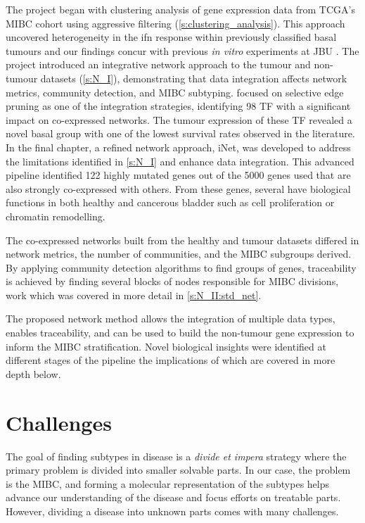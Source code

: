The project began with clustering analysis of gene expression data from TCGA's MIBC cohort using aggressive filtering (\cref{s:clustering_analysis}). This approach uncovered heterogeneity in the \acrlong{ifn} response within previously classified basal tumours \citep{Robertson2017-mg, Kamoun2020-tj} and our findings concur with previous \textit{in vitro} experiments at JBU \citep{Baker2022-bj}. The project introduced an integrative network approach to the tumour and non-tumour datasets (\cref{s:N_I}), demonstrating that data integration affects network metrics, community detection, and MIBC subtyping.  focused on selective edge pruning as one of the integration strategies, identifying 98 TF with a significant impact on co-expressed networks. The tumour expression of these TF revealed a novel basal group with one of the lowest survival rates observed in the literature. In the final chapter, a refined network approach, iNet, was developed to address the limitations identified in \cref{s:N_I} and enhance data integration. This advanced pipeline identified 122 highly mutated genes out of the 5000 genes used that are also strongly co-expressed with others. From these genes, several have biological functions in both healthy and cancerous bladder such as cell proliferation or chromatin remodelling. 

The co-expressed networks built from the healthy and tumour datasets differed in network metrics, the number of communities, and the MIBC subgroups derived. By applying community detection algorithms to find groups of genes, traceability is achieved by finding several blocks of nodes responsible for MIBC divisions, work which was covered in more detail in \cref{s:N_II:std_net}.

% 
The proposed network method allows the integration of multiple data types, enables traceability, and can be used to build the non-tumour gene expression to inform the MIBC stratification. Novel biological insights were identified at different stages of the pipeline the implications of which are covered in more depth below.

\section{Challenges}

The goal of finding subtypes in disease is a \textit{divide et impera} strategy where the primary problem is divided into smaller solvable parts. In our case, the problem is the MIBC, and forming a molecular representation of the subtypes helps advance our understanding of the disease and focus efforts on treatable parts. However, dividing a disease into unknown parts comes with many challenges. 

